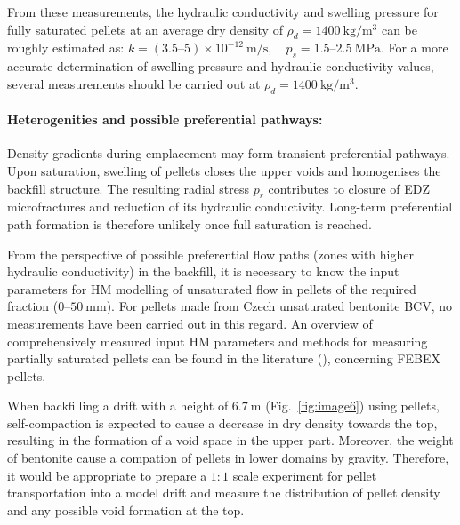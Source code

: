 From these measurements, the hydraulic conductivity and swelling pressure for fully saturated pellets at an average dry density of 
$\rho_d = 1400 \ \mathrm{kg/m^3}$
can be roughly estimated as:
$k = (3.5\text{–}5) \times 10^{-12} \ \mathrm{m/s}, \quad p_s = 1.5\text{–}2.5 \ \mathrm{MPa}$.
For a more accurate determination of swelling pressure and hydraulic conductivity values, several measurements should be carried out at \(\rho_d = 1400 \ \mathrm{kg/m^3}\).


\paragraph{Heterogenities and possible preferential pathways:}
Density gradients during emplacement may form transient preferential pathways.  
Upon saturation, swelling of pellets closes the upper voids and homogenises the 
backfill structure. The resulting radial stress $p_r$ contributes to closure of \Gls{EDZ} 
microfractures and reduction of its hydraulic conductivity. Long-term preferential 
path formation is therefore unlikely once full saturation is reached.

From the perspective of possible preferential flow paths (zones with higher hydraulic conductivity) in the backfill, it is necessary to know the input parameters for HM modelling of unsaturated flow in pellets of the required fraction (\(0\text{–}50 \ \mathrm{mm}\)). For pellets made from Czech unsaturated bentonite \acrshort{BCV}, no measurements have been carried out in this regard. An overview of comprehensively measured input HM parameters and methods for measuring partially saturated pellets can be found in the literature (\cite{Hoffmann2007hydro}), concerning FEBEX pellets.

When backfilling a drift with a height of \(6.7 \ \mathrm{m}\) (Fig.~\ref{fig:image6}) using pellets, self-compaction is expected to cause a decrease in dry density towards the top, resulting in the formation of a void space in the upper part. Moreover, the weight of bentonite cause a compation of pellets in lower domains by gravity. Therefore, it would be appropriate to prepare a \(1{:}1\) scale experiment for pellet transportation into a model drift and measure the distribution of pellet density and any possible void formation at   the top.


